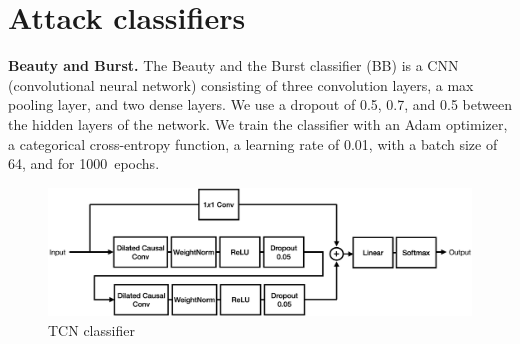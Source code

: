 \section{Attack classifiers}
\label{appendix:tcn}

{\small
\textbf{Beauty and Burst.}
The Beauty and the Burst classifier (BB) \cite{schuster2017beautyburst} is a CNN
(convolutional neural network) consisting of three convolution layers, a max
pooling layer, and two dense layers. We use a dropout of 0.5, 0.7, and 0.5
between the hidden layers of the network. We train the classifier with an Adam
optimizer, a categorical cross-entropy function, a learning rate of 0.01, with a
batch size of 64, and for 1000~epochs.
}

\begin{figure}[t]
    \centering
    \includegraphics[width=\columnwidth]{TCN_arch.pdf}
    \caption{TCN classifier}
    \vspace{-0.4cm}
    \label{fig:tcn}
\end{figure}

